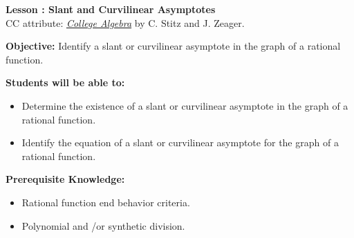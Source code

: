 \documentclass[12pt]{article}
\theoremstyle{definition}
\begin{document}
{\bf \large Lesson : Slant and Curvilinear Asymptotes}
\\ CC attribute: \href{http://www.stitz-zeager.com}{\it{College Algebra}} by C. Stitz and J. Zeager. 
\hfill \doclicenseImage[imagewidth=5em]\\
\par
{\bf Objective:} Identify a slant or curvilinear asymptote in the graph of a rational function.\\
\par
{\bf Students will be able to:}
\begin{itemize}
	\item Determine the existence of a slant or curvilinear asymptote in the graph of a rational function.
	\item Identify the equation of a slant or curvilinear asymptote for the graph of a rational function.
\end{itemize}
{\bf Prerequisite Knowledge:}
\begin{itemize}
	\item Rational function end behavior criteria.
	\item Polynomial and \slash or synthetic division.
\end{itemize}
\hrulefill
\end{document}
